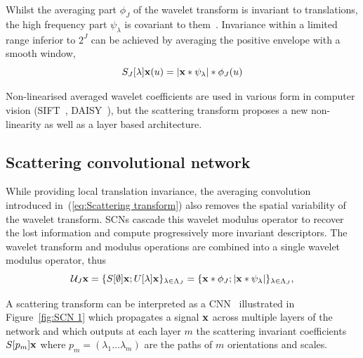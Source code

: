 \documentclass{article}
\begin{document}
    Whilst the averaging part $\phi_{J}$ of the wavelet transform is invariant to translations, the high frequency part $\psi_{\lambda}$ is covariant to them~\cite{mallat2012gis}. Invariance within a
    limited range inferior to $2^{J}$ can be achieved by averaging the positive envelope with a smooth window,
    \vspace{-5pt}
    \begin{equation}
      \label{eq:Scattering transform}
      S_{J}[\lambda]{\bf x}(u) = \left| {\bf x} \ast \psi_{\lambda} \right| \ast \phi_{J}(u)
    \end{equation}
    \vspace{-10pt}
    
    Non-linearised averaged wavelet coefficients are used in various form in computer vision (SIFT~\cite{grabner2006fast}, DAISY~\cite{winder2009picking}), but the scattering transform proposes a new non-linearity as well as a layer based architecture.
  
  \vspace{-5pt}
  \subsection{Scattering convolutional network}
    \label{subsec:SCN/SCN}
    \vspace{-5pt}
    While providing local translation invariance, the averaging convolution introduced in~(\ref{eq:Scattering transform}) also removes the spatial variability of the wavelet transform. SCNs
    cascade this wavelet modulus operator to recover the lost information and compute progressively more invariant descriptors. The wavelet transform and modulus operations are combined into a single wavelet modulus operator, thus
    \vspace{-5pt}
    \begin{equation}
      \mathcal{U}_{J} {\bf x} = \{ S[\emptyset] {\bf x} ; U[\lambda]{\bf x} \}_{\lambda \in \Lambda_{J}} 
          = \{ {\bf x} \ast \phi_{J}; \left| {\bf x} \ast \psi_{\lambda} \right| \}_{\lambda \in \Lambda_{J}},
      \label{eq:One step propagator}
    \end{equation}
    
    A scattering transform can be interpreted as a CNN~\cite{oyallon2014deep} illustrated in Figure~\ref{fig:SCN 1} which propagates a signal ${\bf x}$ across multiple layers of the network and which outputs at each layer $m$ the scattering invariant coefficients $S[p_{m}]{\bf x}$ where $p_{m}=(\lambda_{1} \dots \lambda_{m})$ are the paths of $m$ orientations and scales.
    
\end{document}
